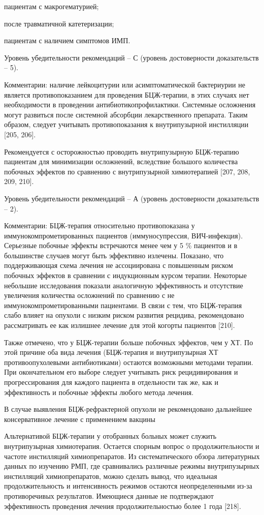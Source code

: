 пациентам с макрогематурией; 

после травматичной катетеризации; 

пациентам с наличием симптомов ИМП. 

Уровень убедительности рекомендаций – С (уровень достоверности доказательств – 5).

Комментарии: наличие лейкоцитурии или асимптоматической бактериурии не является противопоказанием для проведения БЦЖ-терапии, в этих случаях нет необходимости в проведении антибиотикопрофилактики. Системные осложнения могут развиться после системной абсорбции лекарственного препарата. Таким образом, следует учитывать противопоказания к внутрипузырной инстилляции [205, 206]. 

Рекомендуется с осторожностью проводить внутрипузырную БЦЖ-терапию пациентам для минимизации осложнений, вследствие большого количества побочных эффектов по сравнению с внутрипузырной химиотерапией [207, 208, 209, 210].  

Уровень убедительности рекомендаций – А (уровень достоверности доказательств – 2).

Комментарии: БЦЖ-терапия относительно противопоказана у иммунокомпрометированных пациентов (иммуносупрессия, ВИЧ-инфекция). Серьезные побочные эффекты встречаются менее чем у 5 \% пациентов и в большинстве случаев могут быть эффективно излечены. Показано, что поддерживающая схема лечения не ассоциирована с повышенным риском побочных эффектов в сравнении с индукционным курсом терапии. Некоторые небольшие исследования показали аналогичную эффективность и отсутствие увеличения количества осложнений по сравнению с не иммунокомпрометированными пациентами. В связи с тем, что БЦЖ-терапия слабо влияет на опухоли с низким риском развития рецидива, рекомендовано рассматривать ее как излишнее лечение для этой когорты пациентов [210]. 

Также отмечено, что у БЦЖ-терапии больше побочных эффектов, чем у ХТ. По этой причине оба вида лечения (БЦЖ-терапия и внутрипузырная ХТ противоопухолевыми антибиотиками) остаются возможными методами терапии. При окончательном его выборе следует учитывать риск рецидивирования и прогрессирования для каждого пациента в отдельности так же, как и эффективность и побочные эффекты любого метода лечения. 

В случае выявления БЦЖ-рефрактерной опухоли не рекомендовано дальнейшее консервативное лечение с применением вакцины

Альтернативой БЦЖ-терапии у отобранных больных может служить внутрипузырная химиотерапия. Остается спорным вопрос о продолжительности и частоте инстилляций химиопрепаратов. Из систематического обзора литературных данных по изучению РМП, где сравнивались различные режимы внутрипузырных инстилляций химиопрепаратов, можно сделать вывод, что идеальная продолжительность и интенсивность режимов остаются неопределенными из-за противоречивых результатов. Имеющиеся данные не подтверждают эффективность проведения лечения продолжительностью более 1 года [218]. 

